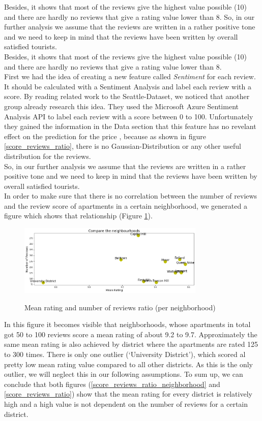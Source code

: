 \documentclass[journal]{IEEEtran}
\begin{document}
%
Besides, it shows that most of the reviews give the highest value possible (10) and there are hardly no reviews that give a rating value lower than 8. So, in our further analysis we assume that the reviews are written in a rather positive tone and we need to keep in mind that the reviews have been written by overall satisfied tourists. \\
Besides, it shows that most of the reviews give the highest value possible (10) and there are hardly no reviews that give a rating value lower than 8. \\
First we had the idea of creating a new feature called \textit{Sentiment} for each review. It should be calculated with a Sentiment Analysis and label each review with a score. By reading related work to the Seattle-Dataset, we noticed that another group already research this idea. They used the Microsoft Azure Sentiment Analysis API to label each review with a score between 0 to 100. Unfortunately they gained the information in the Data section that this feature has no revelant effect on the prediction for the price \cite{RN1}, because as shown in figure \ref{score_reviews_ratio}, there is no Gaussian-Distribution or any other useful distribution for the reviews. \\

So, in our further analysis we assume that the reviews are written in a rather positive tone and we need to keep in mind that the reviews have been written by overall satisfied tourists. \\
In order to make sure that there is no correlation between the number of reviews and the review score of apartments in a certain neighborhood, we generated a figure which shows that relationship (Figure \ref{compare_the_neighbourhoods}).
%
\begin{figure}
  \begin{center}
  \includegraphics[width=3.5in]{photo/2_2_compare_the_neighbourhoods.png}\\
  \caption{Mean rating and number of reviews ratio (per neighborhood)}\label{compare_the_neighbourhoods}
  \end{center}
\end{figure}
%
In this figure it becomes visible that neighborhoods, whose apartments in total got 50 to 100 reviews score a mean rating of about 9.2 to 9.7. Approximately the same mean rating is also achieved by district where the apartments are rated 125 to 300 times. There is only one outlier (‘University District’), which scored al pretty low mean rating value compared to all other districts. As this is the only outlier, we will neglect this in our following assumptions.
To sum up, we can conclude that both figures (\ref{score_reviews_ratio_neighborhood} and \ref{score_reviews_ratio}) show that the mean rating for every district is relatively high and a high value is not dependent on the number of reviews for a certain district.
\end{document}
